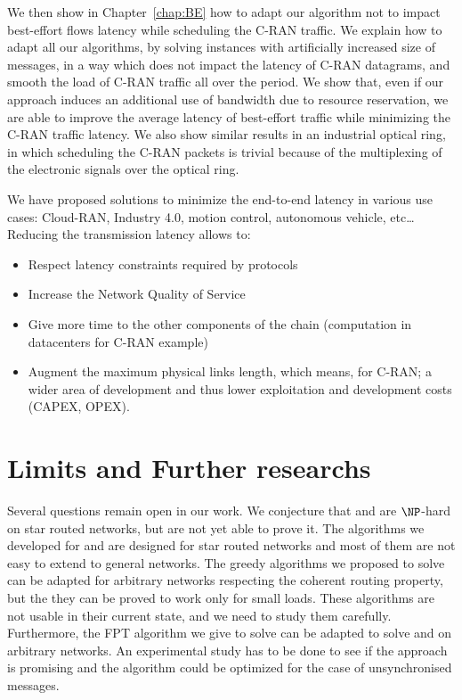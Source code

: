 We then show in Chapter~\ref{chap:BE} how to adapt our algorithm not to impact best-effort flows latency while scheduling the C-RAN traffic. We explain how to adapt all our algorithms, by solving instances with artificially increased size of messages, in a way which does not impact the latency of C-RAN datagrams, and smooth the load of C-RAN traffic all over the period. 
 We show that, even if our approach induces an additional use of bandwidth due to resource reservation, we are able to improve the average latency of best-effort traffic while minimizing the C-RAN traffic latency. We also show similar results in an industrial optical ring, in which scheduling the C-RAN packets is trivial because of the multiplexing of the electronic signals over the optical ring.

We have proposed solutions to minimize the end-to-end latency in various use cases: Cloud-RAN, Industry 4.0, motion control, autonomous vehicle, etc\ldots
Reducing the transmission latency allows to:
\begin{itemize}
	\item Respect latency constraints required by protocols
	\item Increase the Network Quality of Service 
	\item Give more time to the other components of the chain (computation in datacenters for C-RAN example) 
	\item Augment the maximum physical links length, which means, for C-RAN; a wider area of development and thus lower exploitation and development costs (CAPEX, OPEX).
\end{itemize} 

\section*{Limits and Further researchs}

Several questions remain open in our work. We conjecture that \pazl and \pall are $\NP$-hard on star routed networks, but are not yet able to prove it. 
The algorithms we developed for \pazl and \pall are designed for star routed networks and most of them are not easy to extend to general networks. The greedy algorithms we proposed to solve \pazl can be adapted for arbitrary networks respecting the coherent routing property, but the they can be proved to work only for small loads. These algorithms are not usable in their current state, and we need to study them carefully. Furthermore, the FPT algorithm we give to solve \minstra can be adapted to solve \pazl and \pall on arbitrary networks.
An experimental study has to be done to see if the approach is promising and the algorithm could be optimized for the case of unsynchronised messages.

